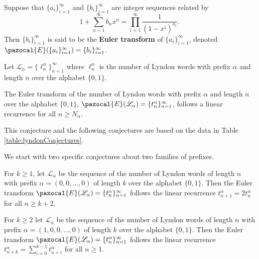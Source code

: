 \begin{definition}
  Suppose that $\{a_i\}_{i=1}^\infty$ and $\{b_i\}_{i=1}^\infty$ are integer sequences
  related by \begin{equation}
    1 + \sum_{n=1}^\infty b_n x^n = \prod_{i=1}^\infty \frac{1}{(1-x^i)^{a_i}}.
  \end{equation} Then $\{b_i\}_{i=1}^\infty$ is said to be the
  \textbf{Euler transform} of $\{a_i\}_{i=1}^\infty$, denoted
  $\pazocal{E}(\{a_i\}_{i=1}^\infty) = \{b_i\}_{i=1}^\infty$.
\end{definition}

\begin{definition}
  Let $\mathcal{L}_\alpha = \{\ell_n^\alpha\}_{n=1}^\infty$ where
  $\ell_n^\alpha$ is the number of Lyndon words with prefix $\alpha$ and length $n$
  over the alphabet $\{0,1\}$.
\end{definition}

\begin{conjecture}
  The Euler transform of the number of Lyndon words with prefix $\alpha$ and
  length $n$ over the alphabet $\{0,1\}$,
  $\pazocal{E}(\mathcal{L_\alpha}) = \{t_{n}^\alpha\}_{n=1}^\infty$,
  follows a linear recurrence for all $n \geq N_\alpha$.
\end{conjecture}

This conjecture and the following conjectures are based on the data
in Table \ref{table:lyndonConjectures}.

We start with two specific conjectures about two families of prefixes.
\begin{conjecture}
  For $k \geq 1$,
  let $\mathcal{L}_\alpha$ be the sequence of the
  number of Lyndon words of length $n$ with prefix
  ${\alpha = (0, 0, \dots, 0)}$ of length $k$ over the alphabet $\{0,1\}$.
  Then the Euler transform
  $\pazocal{E}(\mathcal{L}_\alpha) = \{t_{n}^\alpha\}_{n=1}^\infty$
  follows the linear recurrence $t_{n+1}^\alpha = 2t_{n}^\alpha$ for all
  $n \geq k + 2$.
\end{conjecture}

\begin{conjecture}
  For $k \geq 2$
  let $\mathcal{L}_\alpha$ be the sequence of the
  number of Lyndon words of length $n$ with prefix
  ${\alpha = (1, 0, 0, \dots, 0)}$ of length $k$ over the alphabet $\{0,1\}$.
  Then the Euler transform
  $\pazocal{E}(\mathcal{L}_\alpha) = \{t_{n}^\alpha\}_{n=1}^\infty$
  follows the linear recurrence $t_{n+k}^\alpha = \sum_{i=0}^{k-1} t_{n+i}^\alpha$
  for all $n \geq 1$.
\end{conjecture}

